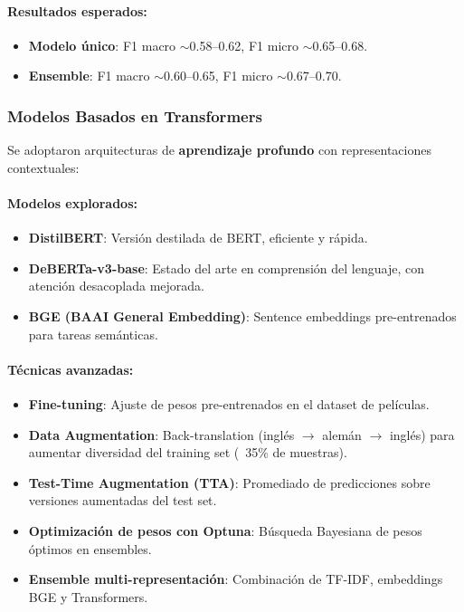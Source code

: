 \paragraph{Resultados esperados:}
\begin{itemize}
    \item \textbf{Modelo único}: F1 macro $\sim$0.58--0.62, F1 micro $\sim$0.65--0.68.
    \item \textbf{Ensemble}: F1 macro $\sim$0.60--0.65, F1 micro $\sim$0.67--0.70.
\end{itemize}

\subsubsection{Modelos Basados en Transformers}

Se adoptaron arquitecturas de \textbf{aprendizaje profundo} con representaciones contextuales:

\paragraph{Modelos explorados:}
\begin{itemize}
    \item \textbf{DistilBERT}: Versión destilada de BERT, eficiente y rápida.
    \item \textbf{DeBERTa-v3-base}: Estado del arte en comprensión del lenguaje, con atención desacoplada mejorada.
    \item \textbf{BGE (BAAI General Embedding)}: Sentence embeddings pre-entrenados para tareas semánticas.
\end{itemize}

\paragraph{Técnicas avanzadas:}
\begin{itemize}
    \item \textbf{Fine-tuning}: Ajuste de pesos pre-entrenados en el dataset de películas.
    \item \textbf{Data Augmentation}: Back-translation (inglés $\rightarrow$ alemán $\rightarrow$ inglés) para aumentar diversidad del training set (~35\% de muestras).
    \item \textbf{Test-Time Augmentation (TTA)}: Promediado de predicciones sobre versiones aumentadas del test set.
    \item \textbf{Optimización de pesos con Optuna}: Búsqueda Bayesiana de pesos óptimos en ensembles.
    \item \textbf{Ensemble multi-representación}: Combinación de TF-IDF, embeddings BGE y Transformers.
\end{itemize}

